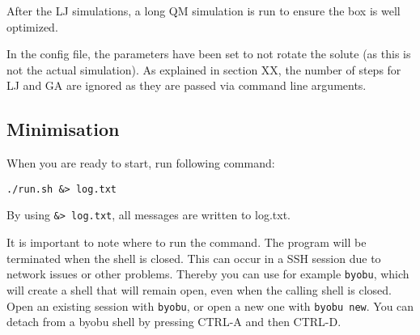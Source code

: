 After the LJ simulations, a long QM simulation is run to ensure the box is well 
optimized.

In the config file, the parameters have been set to not rotate the solute (as 
this is not the actual simulation). As explained in section XX, the number of 
steps for LJ and GA are ignored as they are passed via command line arguments.

\subsection{Minimisation}\label{subs:minimisation}
When you are ready to start, run following command:

\begin{lstlisting}[caption=runmin]
./run.sh &> log.txt
\end{lstlisting}

By using \verb|&> log.txt|, all messages are written to log.txt.

It is important to note where to run the command. The program will be 
terminated when the shell is closed. This can occur in a SSH session due to 
network issues or other problems. Thereby you can use for example \verb|byobu|, 
which will create a shell that will remain open, even when the calling shell is 
closed. Open an existing session with \verb|byobu|, or open a new one with 
\verb|byobu new|. You can detach from a byobu shell by pressing CTRL-A and then 
CTRL-D.